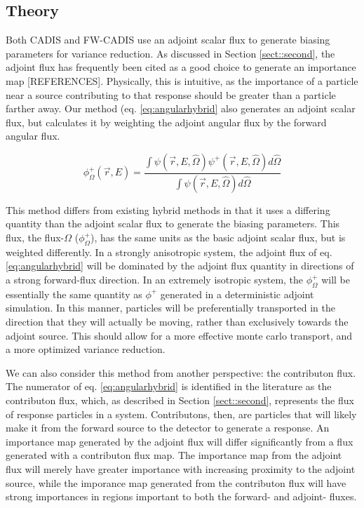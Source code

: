 \documentclass[12pt]{article}
\begin{document}
%
\subsection{Theory}
\label{subsect::theory}

Both CADIS and FW-CADIS use an adjoint scalar flux to generate biasing parameters for variance reduction. As discussed in Section \ref{sect::second}, the adjoint flux has frequently been cited as a good choice to generate an importance map [REFERENCES]. Physically, this is intuitive, as the importance of a particle near a source contributing to that response should be greater than a particle farther away. Our method (eq. \eqref{eq:angularhybrid} also generates an adjoint scalar flux, but calculates it by weighting the adjoint angular flux by the forward angular flux. 

\begin{equation} 
\phi^{+}_{\Omega}(\vec{r},E) = \frac{\int \psi(\vec {r} ,E,\hat{\Omega})\psi^+(\vec {r} ,E,\hat{\Omega})d\hat\Omega }{\int\psi(\vec {r} ,E,\hat{\Omega})d\hat\Omega}
\label{eq:angularhybrid}
\end{equation}

This method differs from existing hybrid methods in that it uses a differing quantity than the adjoint scalar flux to generate the biasing parameters. This flux, the flux-$\Omega$ ($\phi^{+}_{\Omega}$), has the same units as the basic adjoint scalar flux, but is weighted differently. In a strongly anisotropic system, the adjoint flux of eq. \eqref{eq:angularhybrid} will be dominated by the adjoint flux quantity in directions of a strong forward-flux direction. In an extremely isotropic system, the $\phi^{+}_{\Omega}$ will be essentially the same quantity as $\phi^{+}$ generated in a deterministic adjoint simulation. In this manner, particles will be preferentially transported in the direction that they will actually be moving, rather than exclusively towards the adjoint source. This should allow for a more effective monte carlo transport, and a more optimized variance reduction. 

We can also consider this method from another perspective: the contributon flux. The numerator of eq. \eqref{eq:angularhybrid} is identified in the literature as the contributon flux, which, as described in Section \ref{sect::second}, represents the flux of response particles in a system. Contributons, then, are particles that will likely make it from the forward source to the detector to generate a response. An importance map generated by the adjoint flux will differ significantly from a flux generated with a contributon flux map. The importance map from the adjoint flux will merely have greater importance with increasing proximity to the adjoint source, while the imporance map generated from the contributon flux will have strong importances in regions important to both the forward- and adjoint- fluxes. 
\end{document}
